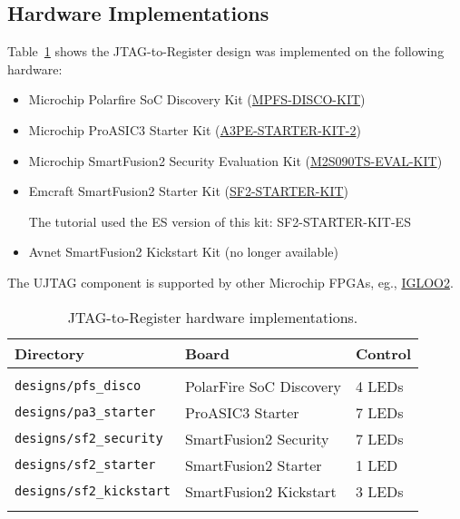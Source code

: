 \subsection{Hardware Implementations}

Table~\ref{tab:jtag_to_register_hardware} shows the JTAG-to-Register
design was implemented on the following hardware:
%
\begin{itemize}
\item Microchip Polarfire SoC Discovery Kit
(\href{https://www.microchip.com/en-us/development-tool/mpfs-disco-kit}
{MPFS-DISCO-KIT})

\item Microchip ProASIC3 Starter Kit
(\href{https://www.microchip.com/en-us/development-tool/a3pe-starter-kit-2}
{A3PE-STARTER-KIT-2})

\item Microchip SmartFusion2 Security Evaluation Kit
(\href{https://www.microchip.com/en-us/development-tool/m2s090ts-eval-kit}
{M2S090TS-EVAL-KIT})

\item Emcraft SmartFusion2 Starter Kit
(\href{https://emcraft.com/products/153}{SF2-STARTER-KIT})

The tutorial used the ES version of this kit: SF2-STARTER-KIT-ES

\item Avnet SmartFusion2 Kickstart Kit (no longer available)

\end{itemize}
%
The UJTAG component is supported by other Microchip FPGAs, eg.,
\href{https://www.microchip.com/en-us/development-tool/m2gl-eval-kit}{IGLOO2}.

%
\begin{table}
\caption{JTAG-to-Register hardware implementations.}
\label{tab:jtag_to_register_hardware}
\begin{center}
\begin{tabular}{|l|l|l|}
\hline
Directory & Board & Control\\
\hline\hline
&&\\
\texttt{designs/pfs\_disco}     & PolarFire SoC Discovery & 4 LEDs\\
\texttt{designs/pa3\_starter}   & ProASIC3 Starter        & 7 LEDs\\
\texttt{designs/sf2\_security}  & SmartFusion2 Security   & 7 LEDs\\
\texttt{designs/sf2\_starter}   & SmartFusion2 Starter    & 1 LED\\
\texttt{designs/sf2\_kickstart} & SmartFusion2 Kickstart  & 3 LEDs\\
&&\\
\hline
\end{tabular}
\end{center}
\end{table}
